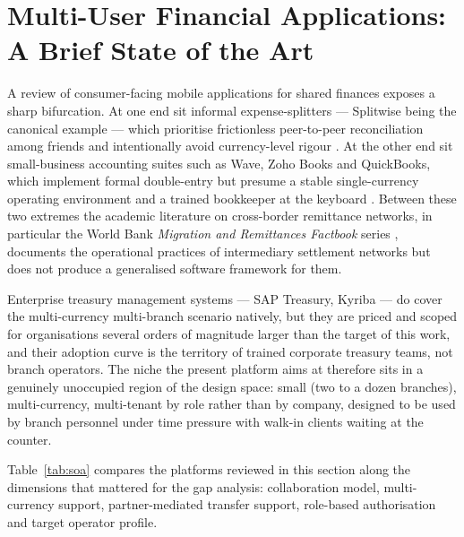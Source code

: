 \section{Multi-User Financial Applications: A Brief State of the Art}
\label{sec:soa}

A review of consumer-facing mobile applications for shared finances exposes a sharp bifurcation. At one end sit informal expense-splitters --- Splitwise being the canonical example --- which prioritise frictionless peer-to-peer reconciliation among friends and intentionally avoid currency-level rigour \cite{splitwise2024}. At the other end sit small-business accounting suites such as Wave, Zoho Books and QuickBooks, which implement formal double-entry but presume a stable single-currency operating environment and a trained bookkeeper at the keyboard \cite{quickbooks2024}. Between these two extremes the academic literature on cross-border remittance networks, in particular the World Bank \emph{Migration and Remittances Factbook} series \cite{ratha2016}, documents the operational practices of intermediary settlement networks but does not produce a generalised software framework for them.

Enterprise treasury management systems --- SAP Treasury, Kyriba \cite{kyriba2023} --- do cover the multi-currency multi-branch scenario natively, but they are priced and scoped for organisations several orders of magnitude larger than the target of this work, and their adoption curve is the territory of trained corporate treasury teams, not branch operators. The niche the present platform aims at therefore sits in a genuinely unoccupied region of the design space: small (two to a dozen branches), multi-currency, multi-tenant by role rather than by company, designed to be used by branch personnel under time pressure with walk-in clients waiting at the counter.

Table~\ref{tab:soa} compares the platforms reviewed in this section along the dimensions that mattered for the gap analysis: collaboration model, multi-currency support, partner-mediated transfer support, role-based authorisation and target operator profile.

